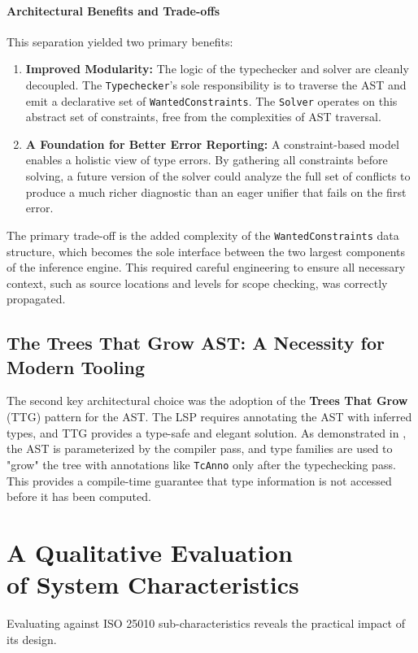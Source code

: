 \paragraph{Architectural Benefits and Trade-offs}
This separation yielded two primary benefits:
\begin{enumerate}
    \item \textbf{Improved Modularity:} The logic of the typechecker and solver are cleanly decoupled. The \texttt{Typechecker}'s sole responsibility is to traverse the AST and emit a declarative set of \texttt{WantedConstraints}. The \texttt{Solver} operates on this abstract set of constraints, free from the complexities of AST traversal.
    \item \textbf{A Foundation for Better Error Reporting:} A constraint-based model enables a holistic view of type errors. By gathering all constraints before solving, a future version of the solver could analyze the full set of conflicts to produce a much richer diagnostic than an eager unifier that fails on the first error.
\end{enumerate}

The primary trade-off is the added complexity of the \texttt{WantedConstraints} data structure, which becomes the sole interface between the two largest components of the inference engine. This required careful engineering to ensure all necessary context, such as source locations and levels for scope checking, was correctly propagated.

\subsection{The Trees That Grow AST: A Necessity for Modern Tooling}
The second key architectural choice was the adoption of the \textbf{Trees That Grow} (TTG) pattern for the AST. The LSP requires annotating the AST with inferred types, and TTG provides a type-safe and elegant solution. As demonstrated in , the AST is parameterized by the compiler pass, and type families are used to "grow" the tree with annotations like \texttt{TcAnno} only after the typechecking pass. This provides a compile-time guarantee that type information is not accessed before it has been computed.

\section[A Qualitative Evaluation of System Characteristics]{A Qualitative Evaluation \\ of System Characteristics}
\label{sec:Discussion:Characteristics}
Evaluating \Arralac against ISO 25010 \cite{iso-25010} sub-characteristics reveals the practical impact of its design.

